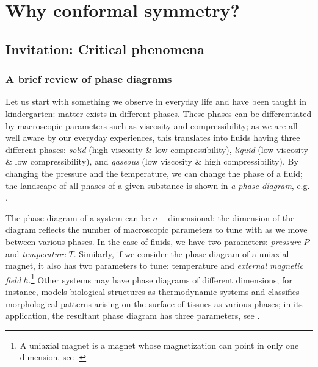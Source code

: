 \chapter{Why conformal symmetry?}
\section{Invitation: Critical phenomena}
\subsection{A brief review of phase diagrams}
Let us start with something we observe in everyday life and have been taught in kindergarten: matter exists in different phases. These phases can be differentiated by macroscopic parameters such as  viscosity and compressibility; as we are all well aware by our everyday experiences, this translates into fluids having three different phases: \emph{solid} (high viscosity \& low compressibility), \emph{liquid} (low viscosity \& low compressibility), and \emph{gaseous} (low viscosity \& high compressibility). By changing the pressure and the temperature, we can change the phase of a fluid; the landscape of all phases of a given substance is shown in \emph{a phase diagram}, e.g. \figref{\ref{fig: phase diagram}}.


The phase diagram of a system can be $n-$dimensional: the dimension of the diagram reflects the number of macroscopic parameters to tune with as we move between various phases. In the case of fluids, we have two parameters: \emph{pressure} $P$ and \emph{temperature} $T$. Similarly, if we consider the phase diagram of a uniaxial magnet, it also has two parameters to tune: temperature and \emph{external magnetic field} $h$.\footnote{A uniaxial magnet is a magnet whose magnetization can point in only one dimension, see \figref{\ref{fig:Ising model}}.} Other systems may have phase diagrams of different dimensions; for instance, \cite{wang2015three} models biological structures as thermodynamic systems and classifies morphological patterns arising on the surface of  tissues as various phases; in its application, the resultant phase diagram has three parameters, see \figref{\ref{fig: phase diagram 2}}.

